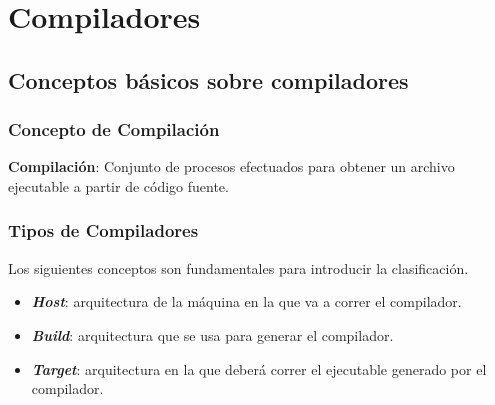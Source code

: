 \chapter{Compiladores}



\section{Conceptos básicos sobre compiladores}


\subsection{Concepto de Compilación}

    \textbf{Compilación}: Conjunto de procesos efectuados para obtener un archivo ejecutable
    a partir de código fuente. \cite{von_hagen_definitive_2006}


\subsection{Tipos de Compiladores}

    Los siguientes conceptos son fundamentales para introducir la clasificación.
    \begin{itemize}
        \item \textbf{\emph{Host}}: arquitectura de la máquina en la que va a correr el compilador.
        \item \textbf{\emph{Build}}: arquitectura que se usa para generar el compilador.
        \item \textbf{\emph{Target}}: arquitectura en la que deberá correr el ejecutable generado por el
        compilador. 
    \end{itemize}
    
